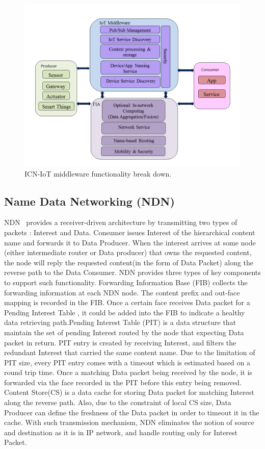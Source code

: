 \begin{figure}
\centering
\includegraphics[width=\columnwidth]{figure/middleware_architecture.png}
\caption{\label{fig:mid_arch} ICN-IoT middleware functionality break down.}
\end{figure}
\subsection{Name Data Networking (NDN)}
NDN~\cite{zhang2010named} provides a receiver-driven architecture by transmitting two types of packets : Interest and Data. Consumer issues Interest of the hierarchical content name and forwards it to Data Producer. When the interest arrives at some node (either intermediate router or Data producer) that owns the requested content, the node will reply the requested content(in the form of Data Packet) along the reverse path to the Data Consumer. NDN provides three types of key components to support such functionality. Forwarding Information Base (FIB) collects the forwarding information at each NDN node. The content prefix and out-face mapping is recorded in the FIB. Once a certain face receives Data packet for a Pending Interest Table , it could be added into the FIB to indicate a healthy data retrieving path.Pending Interest Table (PIT) is a data structure that maintain the set of pending Interest routed by the node that expecting Data packet in return. PIT entry is created by receiving Interest, and filters the redundant Interest that carried the same content name. Due to the limitation of PIT size, every PIT entry comes with a timeout which is estimated based on a round trip time. Once a matching Data packet being received by the node, it is forwarded via the face recorded in the PIT before this entry being removed. Content Store(CS) is a data cache for storing Data packet for matching Interest along the reverse path. Also, due to the constraint of local CS size, Data Producer can define the freshness of the Data packet in order to timeout it in the cache. With such transmission mechanism, NDN eliminates the notion of source and destination as it is in IP network, and handle routing only for Interest Packet.

